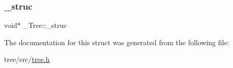 \mbox{\label{struct__Tree_a092eb0c0eeebcdfb1be9ef09aa2da570}} 
\subsubsection{\texorpdfstring{\+\_\+struc}{\_struc}}
{\footnotesize\ttfamily void$\ast$ \+\_\+\+Tree\+::\+\_\+struc}



The documentation for this struct was generated from the following file\+:\begin{DoxyCompactItemize}
\item 
tree/src/\mbox{\hyperlink{tree_8h}{tree.\+h}}\end{DoxyCompactItemize}
